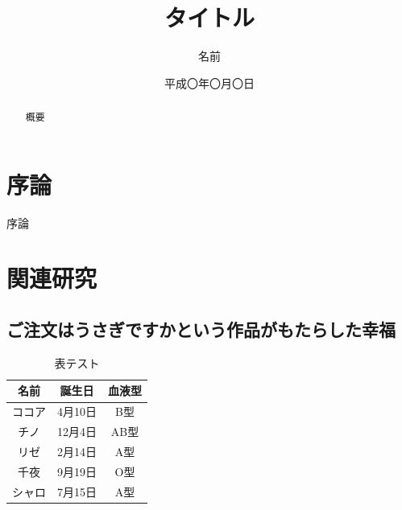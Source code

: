 \documentclass[11pt, a4paper]{jreport} %
\title{タイトル}
\author{名前}
\date{平成〇年〇月〇日}
\begin{document}
\maketitle

\begin{abstract}
概要
\end{abstract}

\tableofcontents

\chapter{序論}
序論

\chapter{関連研究}


\section{ご注文はうさぎですかという作品がもたらした幸福}

\begin{table}[H]
	\begin{center}
		\caption{表テスト}
		\begin{tabular}{|c||c|c|}
			\hline
			名前 & 誕生日 & 血液型\\
			\hline
			\hline
			ココア & 4月10日 & B型\\
			\hline
			チノ & 12月4日 & AB型\\ \hline
			リゼ & 2月14日 & A型\\ \hline
			千夜 & 9月19日 & O型\\ \hline
			シャロ & 7月15日 & A型\\ \hline
		\end{tabular}
	\end{center}
\end{table}


\end{document}
